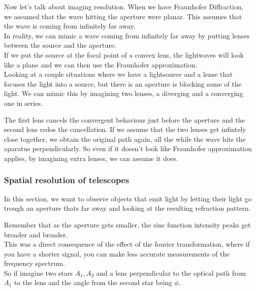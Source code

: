 Now let's talk about imaging resolution. When we have Fraunhofer Diffraction, we assumed that the wave hitting the aperture were planar. This assumes that the wave is coming from infinitely far away.\\

In reality, we can mimic a wave coming from infinitely far away by putting lenses between the source and the aperture.\\

If we put the source at the focal point of a convex lens, the lightwaves will look like a plane and we can then use the Fraunhofer approximation.\\

Looking at a couple situations where we have a lightsource and a lense that focuses the light into a source, but there is an aperture is blocking some of the light. We can mimic this by imagining two lenses, a diverging and a converging one in series.

The first lens cancels the convergent behaviour just before the aperture and the second lens redos the cancellation. If we assume that the two lenses get infintely close together, we obtain the original path again, all the while the wave hits the aparatus perpendicularly.
So even if it doesn't look like Fraunhofer approximation applies, by imagining extra lenses, we can assume it does.\\


\subsubsection{Spatial resolution of telescopes}
In this section, we want to observe objects that emit light by letting their light go trough an aperture thats far away and looking at the resulting refraction pattern.

Remember that as the aperture gets smaller, the sinc function intensity peaks get broader and broader.\\
This was a direct consequence of the effect of the fourier transformation, where if you have a shorter signal, you can make less accurate measurements of the frequency spectrum.\\


So if imagine two stars $A_1, A_2$ and a lens perpendicular to the optical path from $A_1$ to the lens and the angle from the second star being $\phi$.\\

